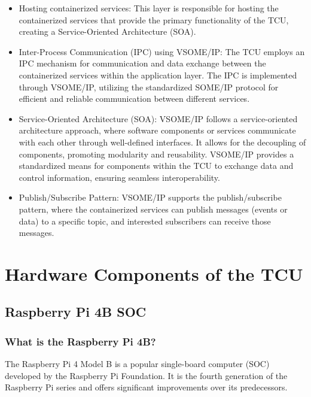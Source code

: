 \documentclass[
12pt,
oneside, 
onehalfspacing, 
nolistspacing, 
parskip, 
chapterinoneline, 
]{AASTCOMPUTER}
\begin{document}
\begin{itemize}
  \item Hosting containerized services: This layer is responsible for hosting the containerized services that provide the primary functionality of the TCU, creating a Service-Oriented Architecture (SOA).
  \item Inter-Process Communication (IPC) using VSOME/IP: The TCU employs an IPC mechanism for communication and data exchange between the containerized services within the application layer. The IPC is implemented through VSOME/IP, utilizing the standardized SOME/IP protocol for efficient and reliable communication between different services.
  \item Service-Oriented Architecture (SOA): VSOME/IP follows a service-oriented architecture approach, where software components or services communicate with each other through well-defined interfaces. It allows for the decoupling of components, promoting modularity and reusability. VSOME/IP provides a standardized means for components within the TCU to exchange data and control information, ensuring seamless interoperability.
  \item Publish/Subscribe Pattern: VSOME/IP supports the publish/subscribe pattern, where the containerized services can publish messages (events or data) to a specific topic, and interested subscribers can receive those messages.
\end{itemize}

\chapter{Hardware Components of the TCU}
\section{Raspberry Pi 4B SOC}
\subsection{What is the Raspberry Pi 4B?}
The Raspberry Pi 4 Model B is a popular single-board computer (SOC) developed by the Raspberry Pi Foundation. It is the fourth generation of the Raspberry Pi series and offers significant improvements over its predecessors.
\end{document}
